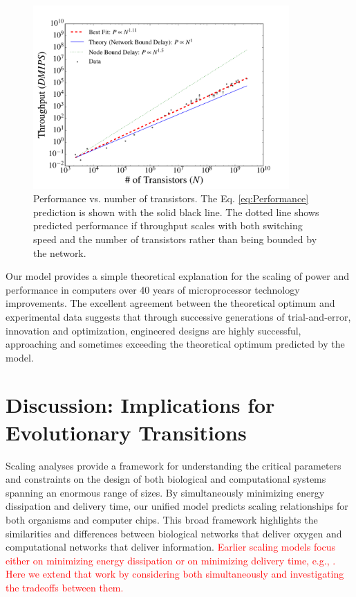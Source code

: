 \documentclass[12pt]{article}
\newcommand{\red}[1]{\textcolor{red}{#1}}
\begin{document}
\begin{figure}[!h]
\centering
\includegraphics[height=70mm]{Figures/ChipsThroughputScaling.pdf}
\caption{Performance vs. number of transistors. The
  Eq. \ref{eq:Performance} prediction is shown with the solid black
  line.  The dotted line shows predicted performance if throughput scales with
  both switching speed and the number of transistors rather than being bounded
by the network.}
\label{fig:throughput}
\end{figure}

Our model provides a simple theoretical explanation for the scaling of power
and performance in computers over 40 years of microprocessor technology
improvements.  The excellent agreement between the theoretical optimum and
experimental data suggests that through successive generations of
trial-and-error, innovation and optimization, engineered designs are highly
successful, approaching and sometimes exceeding the theoretical optimum predicted by the model.


\section{Discussion: Implications for Evolutionary Transitions}
\label{sec:discussion}

Scaling analyses provide a framework for understanding the critical
parameters and constraints on the design of both biological and
computational systems spanning an enormous range of sizes.  By
simultaneously minimizing energy dissipation and delivery time, our
unified model predicts scaling relationships for both organisms and
computer chips.  This broad framework highlights the similarities and
differences between biological networks that deliver oxygen and
computational networks that deliver information.  \red{Earlier scaling
models focus either on minimizing energy dissipation or on minimizing
delivery time, e.g., \cite{west97,RIVER}.  Here we extend that work by considering both
simultaneously and investigating the tradeoffs between them.}
\end{document}
